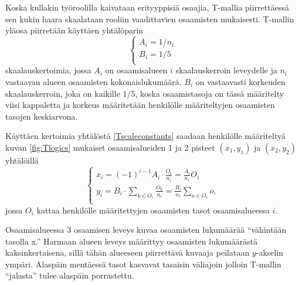 \documentclass[a4paper,finnish,12pt]{article}
\begin{document}
Koska kullakin työroolilla kaivataan erityyppisiä osaajia, T-mallia piirrettäessä sen kukin haara skaalataan rooliin vaadittavien osaamisten mukaisesti. T-mallin yläosa piirretään käyttäen yhtälöparin %
\begin{equation}
\begin{cases}
A_i = 1/n_i \\
B_i = 1/5 \\
\end{cases}
\label{Tscaleconstants}
\end{equation} skaalauskertoimia, jossa $A_i$ on osaamisalueen $i$ skaalauskerroin leveydelle ja $n_i$ vastaavan alueen osaamisten kokonaislukumäärä. $B_i$ on vastaavasti korkeuden skaalauskerroin, joka on kaikille $1/5$, koska osaamistasoja on tässä määritelty viisi kappaletta ja korkeus määritetään henkilölle määriteltyjen osaamisten tasojen keskiarvona.

Käyttäen kertoimia yhtälöstä \eqref{Tscaleconstants} saadaan henkilölle määriteltyä kuvan \ref{fig:Tlogics} mukaiset osaamisalueiden 1 ja 2 pisteet $(x_1, y_1)$ ja $(x_2, y_2)$ yhtälöillä
\begin{equation}
\begin{cases}
x_i = (-1)^{i-1} A_i \cdot \frac{O_i}{n_i} = \frac{A_i}{n_i} O_i \\
y_i = B_i \cdot \sum_{k \in O_i} \frac{O_k}{n_i} = \frac{B_i}{n_i} \sum_{o \in O_i} o, \\
\end{cases}
\end{equation} jossa $O_i$ kattaa henkilölle määritettyjen osaamisten tasot osaamisalueessa $i$.

Osaamisalueessa 3 osaamisen leveys kuvaa osaamisten lukumäärää ``vähintään tasolla x.'' Harmaan alueen leveys määrittyy osaamisten lukumäärästä kaksinkertaisena, sillä tähän alueeseen piirrettävä kuvaaja peilataan $y$-akselin ympäri. Alaspäin mentäessä tasot kasvavat tasaisin väliajoin jolloin T-mallin ``jalasta'' tulee alaspäin porrastettu.
\end{document}
